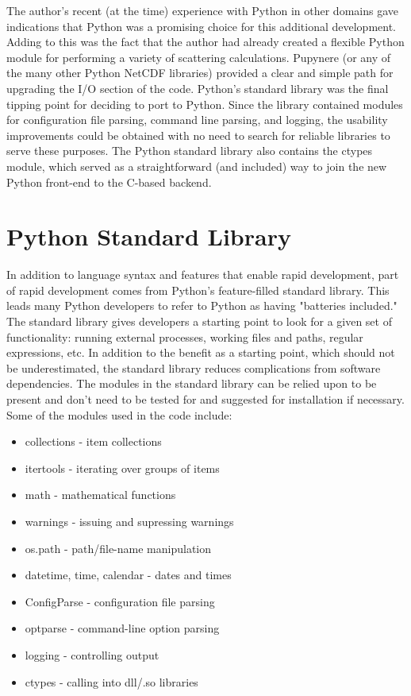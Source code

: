 \documentclass[twocolumn]{article}
\begin{document}
The author's recent (at the time) experience with Python in other domains gave
indications that Python was a promising choice for this additional development.
Adding to this was the fact that the author had already created a flexible Python
module for performing a variety of scattering calculations. Pupynere (or any
of the many other Python NetCDF libraries) provided a clear and simple path
for upgrading the I/O section of the code. Python's standard
library was the final tipping point for deciding to port to Python. Since the
library contained modules for configuration file parsing, command line parsing,
and logging, the usability improvements could be obtained with no need to search
for reliable libraries to serve these purposes. The Python standard library also
contains the ctypes module, which served as a straightforward (and included) way
to join the new Python front-end to the C-based backend.


\section{Python Standard Library}
In addition to language syntax and features that enable rapid development, part of 
rapid development comes from Python's feature-filled standard library. This leads
many Python developers to refer to Python as having "batteries included." The standard
library gives developers a starting point to look for a given set of functionality: 
running external processes, working files and paths, regular expressions, etc. In addition
to the benefit as a starting point, which should not be underestimated, the standard
library reduces complications from software dependencies. The modules in the standard
library can be relied upon to be present and don't need to be tested for and suggested
for installation if necessary. Some of the modules used in the code include:

\begin{itemize}
    \item collections - item collections
    \item itertools - iterating over groups of items
    \item math - mathematical functions
    \item warnings - issuing and supressing warnings
    \item os.path - path/file-name manipulation
    \item datetime, time, calendar - dates and times
    \item ConfigParse - configuration file parsing
    \item optparse - command-line option parsing
    \item logging - controlling output
    \item ctypes - calling into dll/.so libraries
\end{itemize}
\end{document}
